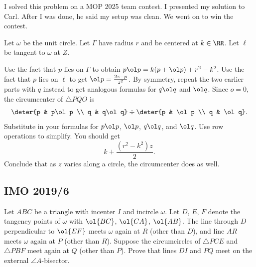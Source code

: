 \documentclass[11pt]{scrartcl}
\begin{document}
\begin{walkthrough}
	I solved this problem on a MOP 2025 team contest. I presented my solution to Carl. After I was done, he said my setup was clean. We went on to win the contest.

	Let $\omega$ be the unit circle. Let $\Gamma$ have radius $r$ and be centered at $k \in \RR$. Let $\ell$ be tangent to $\omega$ at $Z$.
	\begin{walk}
		\ii Use the fact that $p$ lies on $\Gamma$ to obtain $p\ol p = k(p + \ol p) + r^2 - k^2$.
		\ii Use the fact that $p$ lies on $\ell$ to get $\ol p = \frac{2z - p}{z^2}$.
		\ii By symmetry, repeat the two earlier parts with $q$ instead to get analogous formulas for $q\ol q$ and $\ol q$.
		\ii Since $o = 0$, the circumcenter of $\triangle PQO$ is
		\[\deter{p & p\ol p \\ q & q\ol q} \div \deter{p & \ol p \\ q & \ol q}.\]
		Substitute in your formulas for $p\ol p$, $\ol p$, $q\ol q$, and $\ol q$. Use row operations to simplify. You should get
		\[k + \frac{(r^2 - k^2)z}2.\]
		\ii Conclude that as $z$ varies along a circle, the circumcenter does as well.
	\end{walk}
\end{walkthrough}

\pagebreak

\subsection{IMO 2019/6}

\begin{example}[IMO 2019/6]
	Let $ABC$ be a triangle with incenter $I$ and incircle $\omega$.
	Let $D$, $E$, $F$ denote the tangency points of $\omega$ with $\ol{BC}$, $\ol{CA}$, $\ol{AB}$.
	The line through $D$ perpendicular to $\ol{EF}$ meets $\omega$ again at $R$ (other than $D$),
	and line $AR$ meets $\omega$ again at $P$ (other than $R$).
	Suppose the circumcircles of $\triangle PCE$ and $\triangle PBF$ meet again at $Q$ (other than $P$).
	Prove that lines $DI$ and $PQ$ meet on the external $\angle A$-bisector.
\end{example}
\end{document}
